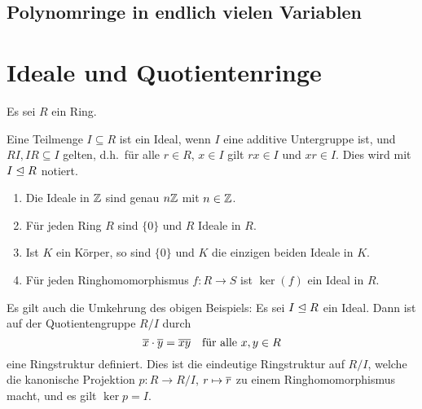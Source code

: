 


\subsection{Polynomringe in endlich vielen Variablen}







\section{Ideale und Quotientenringe}

Es sei $R$ ein Ring.

\begin{definition}
  Eine Teilmenge $I \subseteq R$ ist ein Ideal, wenn $I$ eine additive Untergruppe ist, und $RI, IR \subseteq I$ gelten, d.h.\ für alle $r \in R$, $x \in I$ gilt $rx \in I$ und $xr \in I$.
  Dies wird mit $I \mathrel{\trianglelefteq} R$ notiert.
\end{definition}

\begin{example}
  \begin{enumerate}
    \item
      Die Ideale in $\mathbb{Z}$ sind genau $n\mathbb{Z}$ mit $n \in \mathbb{Z}$.
    \item
      Für jeden Ring $R$ sind $\{0\}$ und $R$ Ideale in $R$.
    \item
      Ist $K$ ein Körper, so sind $\{0\}$ und $K$ die einzigen beiden Ideale in $K$.
    \item
      Für jeden Ringhomomorphismus $f \colon R \to S$ ist $\ker(f)$ ein Ideal in $R$.
  \end{enumerate}
\end{example}

Es gilt auch die Umkehrung des obigen Beispiels:
Es sei $I \mathrel{\trianglelefteq} R$ ein Ideal.
Dann ist auf der Quotientengruppe $R/I$ durch
\[
    \overline{x} \cdot \overline{y}
  = \overline{xy}
  \quad
  \text{für alle $x, y \in R$}
\]
eine Ringstruktur definiert.
Dies ist die eindeutige Ringstruktur auf $R/I$, welche die kanonische Projektion $p \colon R \to R/I$, $r \mapsto \overline{r}$ zu einem Ringhomomorphismus macht, und es gilt $\ker p = I$.

